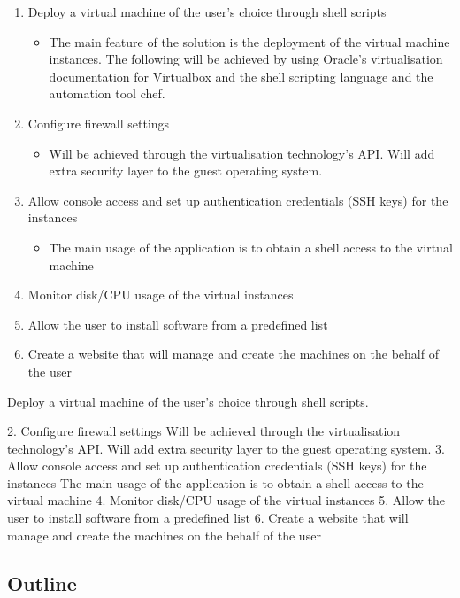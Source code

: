 \documentclass{article}
\begin{document}
	  \begin{enumerate}
	  	\item Deploy a virtual machine of the user's choice through shell scripts
		  	\begin{itemize}
		  		\item The main feature of the solution is the deployment of the virtual machine instances. The following will be achieved by using Oracle's virtualisation documentation for Virtualbox and the shell scripting language and the automation tool chef.
		    \end{itemize}

	  	\item Configure firewall settings
		  	\begin{itemize}
		  		\item Will be achieved through the virtualisation technology's API. Will add extra security layer to the guest operating system.
		  	\end{itemize}

	  	\item Allow console access and set up authentication credentials (SSH keys) for the instances
		  	\begin{itemize}
		  		\item The main usage of the application is to obtain a shell access to the virtual machine
		  	\end{itemize}
	  	\item Monitor disk/CPU usage of the virtual instances
	  	\item Allow the user to install software from a predefined list
	  	\item Create a website that will manage and create the machines on the behalf of the user 	
	  \end{enumerate}
	  
	  Deploy a virtual machine of the user's choice through shell scripts.
	  
	  2. Configure firewall settings
	  Will be achieved through the virtualisation technology's API. Will add extra security layer to
	  the guest operating system.
	  3. Allow console access and set up authentication credentials (SSH keys) for the instances
	  The main usage of the application is to obtain a shell access to the virtual machine
	  4. Monitor disk/CPU usage of the virtual instances
	  5. Allow the user to install software from a predefined list
	  6. Create a website that will manage and create the machines on the behalf of the user
  \subsection{Outline}
\end{document}
